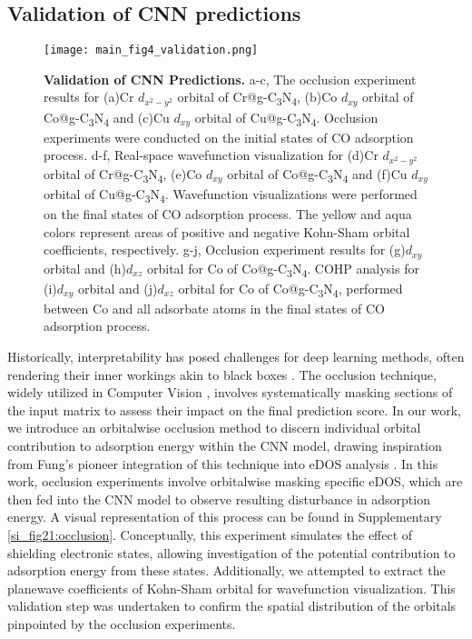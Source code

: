 
\subsection{Validation of CNN predictions}

\begin{figure}[htbp]
    \centering
    \texttt{[image: main\_fig4\_validation.png]}
    \caption{\textbf{Validation of CNN Predictions.}
    a-c, The occlusion experiment results for (a)Cr $d_{x^2-y^2}$ orbital of Cr@g-C\textsubscript{3}N\textsubscript{4}, (b)Co $d_{xy}$ orbital of Co@g-C\textsubscript{3}N\textsubscript{4} and (c)Cu $d_{xy}$ orbital of Cu@g-C\textsubscript{3}N\textsubscript{4}.
    Occlusion experiments were conducted on the initial states of CO adsorption process.
    d-f, Real-space wavefunction visualization for (d)Cr $d_{x^2-y^2}$ orbital of Cr@g-C\textsubscript{3}N\textsubscript{4}, (e)Co $d_{xy}$ orbital of Co@g-C\textsubscript{3}N\textsubscript{4} and (f)Cu $d_{xy}$ orbital of Cu@g-C\textsubscript{3}N\textsubscript{4}.
    Wavefunction visualizations were performed on the final states of CO adsorption process.
    The yellow and aqua colors represent areas of positive and negative Kohn-Sham orbital coefficients, respectively.
    g-j, Occlusion experiment results for (g)$d_{xy}$ orbital and (h)$d_{xz}$ orbital for Co of Co@g-C\textsubscript{3}N\textsubscript{4}.
    COHP analysis for (i)$d_{xy}$ orbital and (j)$d_{xz}$ orbital for Co of Co@g-C\textsubscript{3}N\textsubscript{4}, performed between Co and all adsorbate atoms in the final states of CO adsorption process.}
    \label{main_fig4:validation}
\end{figure}

Historically, interpretability has posed challenges for deep learning methods, often rendering their inner workings akin to black boxes \cite{zhang2018interpretable, zhang2018visual, savage2022breaking}.
The occlusion technique, widely utilized in Computer Vision \cite{zeiler2014visualizing, kortylewski2020combining, wang2020robust}, involves systematically masking sections of the input matrix to assess their impact on the final prediction score.
In our work, we introduce an orbitalwise occlusion method to discern individual orbital contribution to adsorption energy within the CNN model, drawing inspiration from Fung's pioneer integration of this technique into eDOS analysis \cite{fung2021machine}.
In this work, occlusion experiments involve orbitalwise masking specific eDOS, which are then fed into the CNN model to observe resulting disturbance in adsorption energy.
A visual representation of this process can be found in Supplementary \cref{si_fig21:occlusion}. Conceptually, this experiment simulates the effect of shielding electronic states, allowing investigation of the potential contribution to adsorption energy from these states.
Additionally, we attempted to extract the planewave coefficients of Kohn-Sham orbital for wavefunction visualization.
This validation step was undertaken to confirm the spatial distribution of the orbitals pinpointed by the occlusion experiments.

